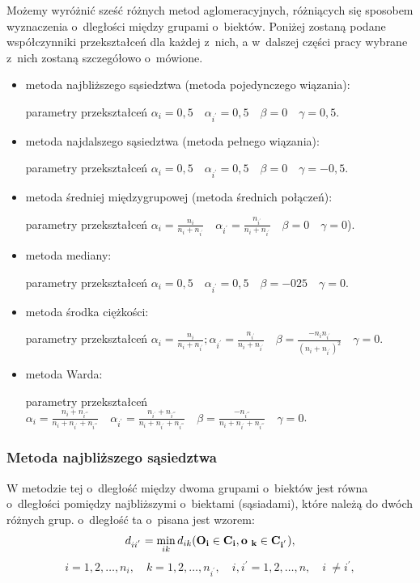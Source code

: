 \documentclass[12pt,a4paper]{report}
\begin{document}
Możemy wyróżnić sześć różnych metod aglomeracyjnych, różniących się sposobem wyznaczenia o~dległości między grupami o~biektów. Poniżej zostaną podane współczynniki przekształceń dla każdej z~nich, a w~dalszej części pracy wybrane z~nich zostaną szczegółowo o~mówione.
\begin{itemize}
\item metoda najbliższego sąsiedztwa (metoda pojedynczego wiązania):

parametry  przekształceń $\alpha_{i}=0,5 \quad \alpha_{i^{'}}=0,5 \quad  \beta=0 \quad \gamma=0,5$.
\item metoda najdalszego sąsiedztwa (metoda pełnego wiązania):

parametry  przekształceń $\alpha_{i}=0,5 \quad \alpha_{i^{'}}=0,5 \quad \beta=0 \quad \gamma=-0,5$.
\item metoda średniej międzygrupowej (metoda średnich połączeń):

parametry  przekształceń $\alpha_{i}=\frac{n_{i}}{n_{i} + n_{i^{'}}} \quad \alpha_{i^{'}}=\frac{n_{i^{'}}}{n_{i} + n_{i^{'}}} \quad \beta=0 \quad \gamma=0$).
\item metoda mediany:

parametry  przekształceń $\alpha_{i}=0,5 \quad \alpha_{i^{'}}=0,5 \quad \beta=-025 \quad \gamma=0$.
\item metoda środka ciężkości:

parametry  przekształceń $\alpha_{i}=\frac{n_{i}}{n_{i} + n_{i^{'}}}; \alpha_{i^{'}}=\frac{n_{i^{'}}}{n_{i} + n_{i^{'}}} \quad \beta=\frac{-n_{i}n_{i^{'}}}{(n_{i} + n_{i^{'}})^{2}} \quad \gamma=0$.
\item metoda Warda:

parametry  przekształceń $\alpha_{i}=\frac{n_{i}+n_{i^{'''}}}{n_{i} + n_{i^{'}}+n_{i^{'''}}} \quad \alpha_{i^{'}}=\frac{n_{i^{'}}+n_{i^{'''}}}{n_{i} + n_{i^{'}}+n_{i^{'''}}} \quad \beta=\frac{-n_{i^{'''}}}{n_{i} + n_{i^{'}}+n_{i^{'''}}} \quad \gamma=0$.

\end{itemize}
 
\subsubsection{Metoda najbliższego sąsiedztwa}


W metodzie tej o~dległość między dwoma grupami o~biektów jest równa o~dległości pomiędzy najbliższymi o~biektami (sąsiadami), które należą do dwóch różnych grup. o~dległość ta o~pisana jest wzorem:
$$
d_{ii^{'}}= \min\limits_{ik} {d_{ik}(\bf{O_i} \in C_{i}, o~_{k} \in C_{i^{'}})},
$$
$$
i=1,2,\dots,n_{i}, \quad k=1,2,\dots,n_{i^{'}}, \quad i,i^{'}=1,2,\dots,n, \quad i~\neq i^{'}, 
$$
\end{document}
